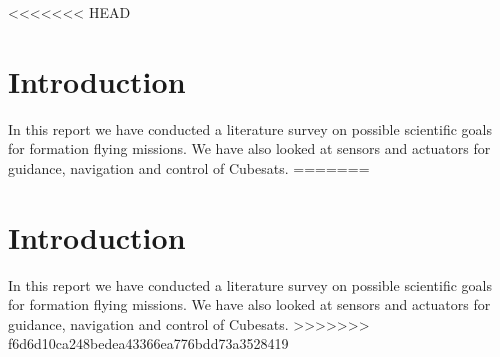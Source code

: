 <<<<<<< HEAD
\section{Introduction}
In this report we have conducted a literature survey on possible scientific goals for formation flying missions. We have also looked at sensors and actuators for guidance, navigation and control of Cubesats. 
=======
\section{Introduction}
In this report we have conducted a literature survey on possible scientific goals for formation flying missions. We have also looked at sensors and actuators for guidance, navigation and control of Cubesats. 
>>>>>>> f6d6d10ca248bedea43366ea776bdd73a3528419
